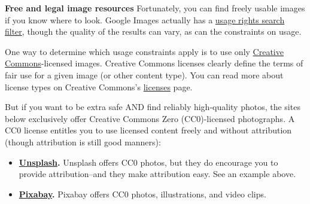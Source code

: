 \documentclass[]{book}
\providecommand{\tightlist}{%
  \setlength{\itemsep}{0pt}\setlength{\parskip}{0pt}}
\theoremstyle{definition}
\theoremstyle{definition}
\theoremstyle{definition}
\theoremstyle{remark}
\begin{document}
\textbf{Free and legal image resources} Fortunately, you can find freely
usable images if you know where to look. Google Images actually has a
\href{https://support.google.com/websearch/answer/29508?hl=en}{usage
rights search filter}, though the quality of the results can vary, as
can the constraints on usage.

One way to determine which usage constraints apply is to use only
\href{https://search.creativecommons.org/}{Creative Commons}-licensed
images. Creative Commons licenses clearly define the terms of fair use
for a given image (or other content type). You can read more about
license types on Creative Commons's
\href{https://creativecommons.org/licenses/}{licenses} page.

But if you want to be extra safe AND find reliably high-quality photos,
the sites below exclusively offer Creative Commons Zero (CC0)-licensed
photographs. A CC0 license entitles you to use licensed content freely
and without attribution (though attribution is still good manners):

\begin{itemize}
\tightlist
\item
  \textbf{\href{https://unsplash.com/}{Unsplash}.} Unsplash offers CC0
  photos, but they do encourage you to provide attribution--and they
  make attribution easy. See an example above.
\item
  \textbf{\href{https://pixabay.com/}{Pixabay}.} Pixabay offers CC0
  photos, illustrations, and video clips.
\end{itemize}


\end{document}
